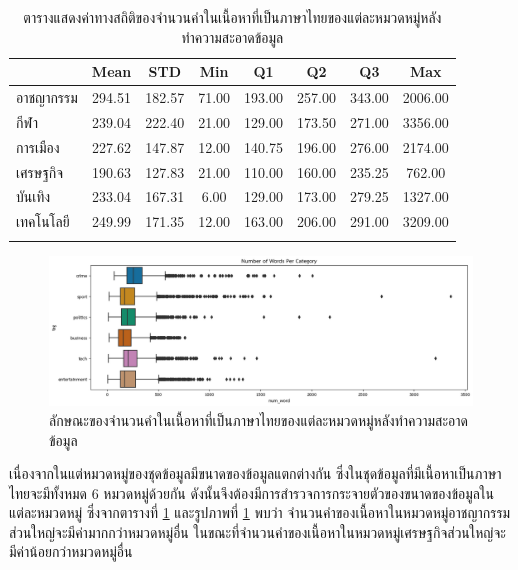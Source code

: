 \documentclass[12pt,oneside,openright,a4paper]{cpe-thai-project}
\begin{document}
        \begin{longtable}[!ht]{lccccccc}
          \caption{ตารางแสดงค่าทางสถิติของจำนวนคำในเนื้อหาที่เป็นภาษาไทยของแต่ละหมวดหมู่หลังทำความสะอาดข้อมูล}
          \label{tbl:thai_stat}\\
          \hhline{========}
          \multicolumn{1}{c}{\textbf{หมวดหมู่}} & \textbf{Mean} & \textbf{STD} & \textbf{Min} & \textbf{Q1} & \textbf{Q2} & \textbf{Q3} & \textbf{Max}\\ \hline
          \endhead
          อาชญากรรม    & 294.51 & 182.57 & 71.00 & 193.00 & 257.00 & 343.00 & 2006.00  \\ %
          กีฬา          & 239.04 & 222.40 & 21.00 & 129.00 & 173.50 & 271.00 & 3356.00  \\ %
          การเมือง       & 227.62 & 147.87 & 12.00 & 140.75 & 196.00 & 276.00 & 2174.00  \\ %
          เศรษฐกิจ         & 190.63 & 127.83  & 21.00 & 110.00 & 160.00 & 235.25 & 762.00  \\ %
          บันเทิง        & 233.04 & 167.31 & 6.00 & 129.00 & 173.00 & 279.25 & 1327.00  \\ %
          เทคโนโลยี     & 249.99 & 171.35 & 12.00 & 163.00 & 206.00 & 291.00 & 3209.00  \\ \hhline{========}
        \end{longtable}
        \begin{figure}[!ht]\centering
          \includegraphics[width=\textwidth]{./img/thai_stat/boxplot_all.png}
          \caption{ลักษณะของจำนวนคำในเนื้อหาที่เป็นภาษาไทยของแต่ละหมวดหมู่หลังทําความสะอาดข้อมูล}\label{fig:thai_boxplot}
        \end{figure}
        \hspace{1cm}เนื่องจากในแต่หมวดหมู่ของชุดข้อมูลมีขนาดของข้อมูลแตกต่างกัน ซึ่งในชุดข้อมูลที่มีเนื้อหาเป็นภาษาไทยจะมีทั้งหมด 6 หมวดหมู่ด้วยกัน
        ดังนั้นจึงต้องมีการสำรวจการกระจายตัวของขนาดของข้อมูลในแต่ละหมวดหมู่ ซึ่งจากตารางที่ \ref{tbl:thai_stat} และรูปภาพที่ \ref{fig:thai_boxplot}
        พบว่า จำนวนคำของเนื้อหาในหมวดหมู่อาชญากรรมส่วนใหญ่จะมีค่ามากกว่าหมวดหมู่อื่น ในขณะที่จำนวนคำของเนื้อหาในหมวดหมู่เศรษฐกิจส่วนใหญ่จะมีค่าน้อยกว่าหมวดหมู่อื่น
\end{document}
